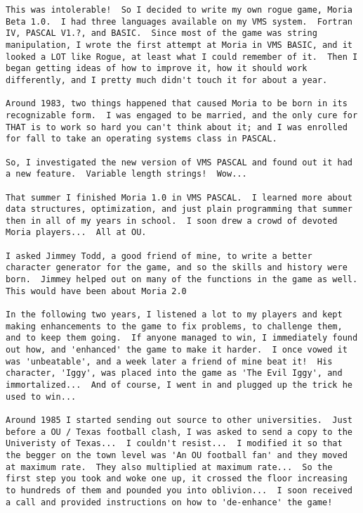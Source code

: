 \begin{verbatim}
This was intolerable!  So I decided to write my own rogue game, Moria
Beta 1.0.  I had three languages available on my VMS system.  Fortran
IV, PASCAL V1.?, and BASIC.  Since most of the game was string
manipulation, I wrote the first attempt at Moria in VMS BASIC, and it
looked a LOT like Rogue, at least what I could remember of it.  Then I
began getting ideas of how to improve it, how it should work
differently, and I pretty much didn't touch it for about a year.

Around 1983, two things happened that caused Moria to be born in its
recognizable form.  I was engaged to be married, and the only cure for
THAT is to work so hard you can't think about it; and I was enrolled
for fall to take an operating systems class in PASCAL.

So, I investigated the new version of VMS PASCAL and found out it had
a new feature.  Variable length strings!  Wow...

That summer I finished Moria 1.0 in VMS PASCAL.  I learned more about
data structures, optimization, and just plain programming that summer
then in all of my years in school.  I soon drew a crowd of devoted
Moria players...  All at OU.

I asked Jimmey Todd, a good friend of mine, to write a better
character generator for the game, and so the skills and history were
born.  Jimmey helped out on many of the functions in the game as well.
This would have been about Moria 2.0

In the following two years, I listened a lot to my players and kept
making enhancements to the game to fix problems, to challenge them,
and to keep them going.  If anyone managed to win, I immediately found
out how, and 'enhanced' the game to make it harder.  I once vowed it
was 'unbeatable', and a week later a friend of mine beat it!  His
character, 'Iggy', was placed into the game as 'The Evil Iggy', and
immortalized...  And of course, I went in and plugged up the trick he
used to win...

Around 1985 I started sending out source to other universities.  Just
before a OU / Texas football clash, I was asked to send a copy to the
Univeristy of Texas...  I couldn't resist...  I modified it so that
the begger on the town level was 'An OU football fan' and they moved
at maximum rate.  They also multiplied at maximum rate...  So the
first step you took and woke one up, it crossed the floor increasing
to hundreds of them and pounded you into oblivion...  I soon received
a call and provided instructions on how to 'de-enhance' the game!


\end{verbatim}
